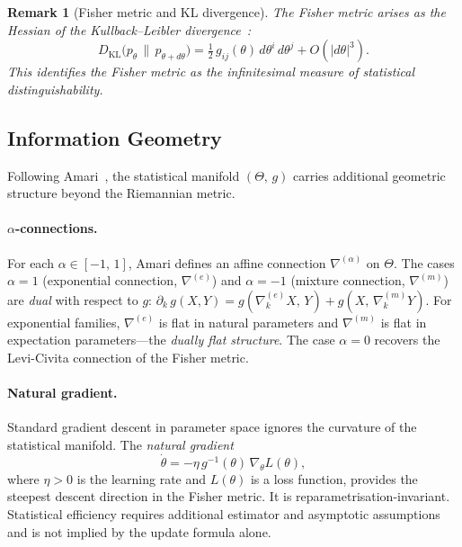 \documentclass[12pt]{article}
\newtheorem{remark}[theorem]{Remark}
\begin{document}
\begin{remark}[Fisher metric and KL divergence]
\label{rem:fisher_KL}
The Fisher metric arises as the Hessian of the
Kullback--Leibler divergence~\cite{CoverThomas2006}:
\begin{equation}
\label{eq:fisher_KL}
D_{\mathrm{KL}}\bigl(p_\theta \,\|\, p_{\theta+d\theta}\bigr)
= \tfrac{1}{2}\,g_{ij}(\theta)\,d\theta^i\,d\theta^j
  + O\!\left(|d\theta|^3\right).
\end{equation}
This identifies the Fisher metric as the infinitesimal
measure of statistical distinguishability.
\end{remark}

\subsection{Information Geometry}
\label{subsec:info_geom}

Following Amari~\cite{Amari1985,AmariNagaoka2000}, the
statistical manifold $(\Theta,\,g)$ carries additional
geometric structure beyond the Riemannian metric.

\paragraph{$\alpha$-connections.}
For each $\alpha \in [-1,\,1]$, Amari defines an affine
connection $\nabla^{(\alpha)}$ on $\Theta$.
The cases $\alpha = 1$ (exponential connection,
$\nabla^{(e)}$) and $\alpha = -1$ (mixture connection,
$\nabla^{(m)}$) are \emph{dual} with respect to $g$:
$\partial_k\,g(X,Y)
= g(\nabla_k^{(e)}X,\,Y)
+ g(X,\,\nabla_k^{(m)}Y)$.
For exponential families, $\nabla^{(e)}$ is flat in natural
parameters and $\nabla^{(m)}$ is flat in expectation
parameters---the \emph{dually flat structure}.
The case $\alpha = 0$ recovers the Levi-Civita connection of
the Fisher metric.

\paragraph{Natural gradient.}
Standard gradient descent in parameter space ignores the
curvature of the statistical manifold.
The \emph{natural gradient}~\cite{Amari1998}
\begin{equation}
\label{eq:natural_gradient}
\dot{\theta}
= -\eta\,g^{-1}(\theta)\,\nabla_\theta L(\theta),
\end{equation}
where $\eta > 0$ is the learning rate and $L(\theta)$ is a
loss function, provides the steepest descent direction in the
Fisher metric.
It is reparametrisation-invariant.  Statistical efficiency requires
additional estimator and asymptotic assumptions and is not implied by
the update formula alone.
\end{document}
